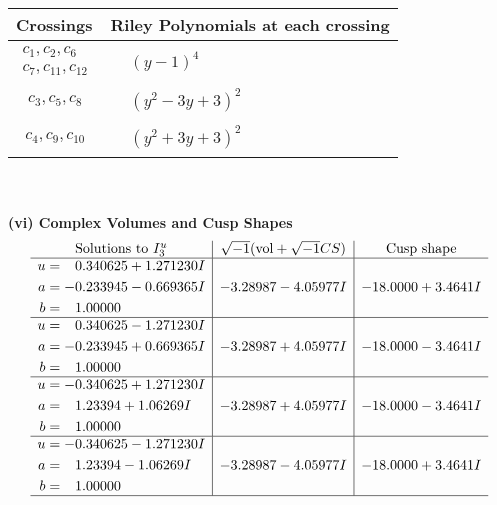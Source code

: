 \documentclass[1p]{elsarticle_modified}
\theoremstyle{definition}
\newcommand{\I}{\sqrt{-1}}
\begin{document}
\begin{tabular}{m{50pt}|m{274pt}}
Crossings & \hspace{64pt}Riley Polynomials at each crossing \\
\hline $$\begin{aligned}c_{1},c_{2},c_{6}\\c_{7},c_{11},c_{12}\end{aligned}$$&$\begin{aligned}
&(y-1)^4
\end{aligned}$\\
\hline $$\begin{aligned}c_{3},c_{5},c_{8}\end{aligned}$$&$\begin{aligned}
&(y^2-3 y+3)^2
\end{aligned}$\\
\hline $$\begin{aligned}c_{4},c_{9},c_{10}\end{aligned}$$&$\begin{aligned}
&(y^2+3 y+3)^2
\end{aligned}$\\
\hline
\end{tabular}\\~\\
\newpage\flushleft \textbf{(vi) Complex Volumes and Cusp Shapes}
$$\begin{array}{c|c|c}  
\text{Solutions to }I^u_{3}& \I (\text{vol} + \sqrt{-1}CS) & \text{Cusp shape}\\
 \hline 
\begin{aligned}
u &= \phantom{-}0.340625 + 1.271230 I \\
a &= -0.233945 - 0.669365 I \\
b &= \phantom{-}1.00000\phantom{ +0.000000I}\end{aligned}
 & -3.28987 - 4.05977 I & -18.0000 + 3.4641 I \\ \hline\begin{aligned}
u &= \phantom{-}0.340625 - 1.271230 I \\
a &= -0.233945 + 0.669365 I \\
b &= \phantom{-}1.00000\phantom{ +0.000000I}\end{aligned}
 & -3.28987 + 4.05977 I & -18.0000 - 3.4641 I \\ \hline\begin{aligned}
u &= -0.340625 + 1.271230 I \\
a &= \phantom{-}1.23394 + 1.06269 I \\
b &= \phantom{-}1.00000\phantom{ +0.000000I}\end{aligned}
 & -3.28987 + 4.05977 I & -18.0000 - 3.4641 I \\ \hline\begin{aligned}
u &= -0.340625 - 1.271230 I \\
a &= \phantom{-}1.23394 - 1.06269 I \\
b &= \phantom{-}1.00000\phantom{ +0.000000I}\end{aligned}
 & -3.28987 - 4.05977 I & -18.0000 + 3.4641 I\\
 \hline 
 \end{array}$$\newpage\newpage\renewcommand{\arraystretch}{1}
\end{document}
